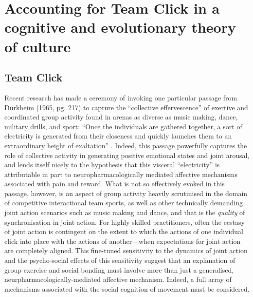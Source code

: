 \section{Accounting for Team Click in a cognitive and evolutionary theory of culture}

\subsection{Team Click}
Recent research has made a ceremony of invoking one particular passage from Durkheim (1965, pg. 217) to capture the ``collective effervescence'' of exertive and coordinated group activity found in arenas as diverse as music making, dance, military drills, and sport:  ``Once the individuals are gathered together, a sort of electricity is generated from their closeness and quickly launches them to an extraordinary height of exaltation'' \citep{McNeill1995,Konvalinka2011,Fischer2014,Mogan2017}. Indeed, this passage powerfully captures the role of collective activity in generating positive emotional states and joint arousal, and lends itself nicely to the hypothesis that this visceral ``electricity'' is attributable in part to neuropharmacologically mediated affective mechanisms associated with pain and reward\citep{Dunbar2008,Cohen2009,Fischer2014,Launay2016}.
What is not so effectively evoked in this passage, however, is an aspect of group activity heavily scrutinised in the domain of competitive interactional team sports, as well as other technically demanding joint action scenarios such as music making and dance, and that is the \textit{quality} of synchronisation in joint action.  For highly skilled practitioners, often the ecstasy of joint action is contingent on the extent to which the actions of one individual click into place with the actions of another---when expectations for joint action are completely aligned.  This fine-tuned sensitivity to the dynamics of joint action and the psycho-social effects of this sensitivity suggest that an explanation of group exercise and social bonding must involve more than just a generalised, neurpharmacologically-mediated affective mechanism.  Indeed, a full array of mechanisms associated with the social cognition of movement must be considered.


